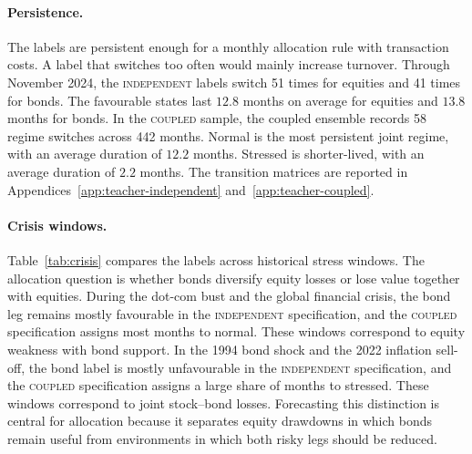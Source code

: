 \documentclass[10pt]{article}
\newcommand{\Acoup}{\textsc{coupled}}
\newcommand{\Bindep}{\textsc{independent}}
\begin{document}
\paragraph{Persistence.}
The labels are persistent enough for a monthly allocation rule with transaction costs. A
label that switches too often would mainly increase turnover. Through November 2024, the
\Bindep{} labels switch 51 times for equities and 41 times for bonds. The favourable states
last \(12.8\) months on average for equities and \(13.8\) months for bonds. In the \Acoup{}
sample, the coupled ensemble records 58 regime switches across 442 months. Normal is the
most persistent joint regime, with an average duration of \(12.2\) months. Stressed is
shorter-lived, with an average duration of \(2.2\) months. The transition matrices are
reported in Appendices~\ref{app:teacher-independent} and~\ref{app:teacher-coupled}.

\paragraph{Crisis windows.}
Table~\ref{tab:crisis} compares the labels across historical stress windows. The allocation
question is whether bonds diversify equity losses or lose value together with equities.
During the dot-com bust and the global financial crisis, the bond leg remains mostly
favourable in the \Bindep{} specification, and the \Acoup{} specification assigns most
months to normal. These windows correspond to equity weakness with bond support. In the
1994 bond shock and the 2022 inflation sell-off, the bond label is mostly unfavourable in
the \Bindep{} specification, and the \Acoup{} specification assigns a large share of months
to stressed. These windows correspond to joint stock--bond losses. Forecasting this
distinction is central for allocation because it separates equity drawdowns in which bonds
remain useful from environments in which both risky legs should be reduced.
\end{document}
